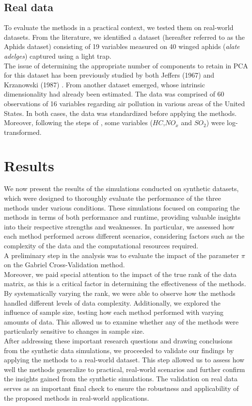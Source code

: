 \documentclass{article}
\begin{document}
\subsection{Real data}
To evaluate the methods in a practical context, we tested them on 
real-world datasets. 
From the literature, we identified a dataset (hereafter referred to as the Aphids dataset) consisting 
of 19 variables measured on 40 winged aphids (\textit{alate adelges}) captured using a 
light trap. \\
The issue of determining the appropriate number of components to retain in PCA for this dataset 
has been previously studied by both Jeffers (1967) \cite{Jeffers} and Krzanowski (1987) \cite{Krzanowski}. 
From \cite{Dray} another dataset emerged, whose intrinsic dimensionality had already been estimated. The
data was comprised of 60 observations of 16 variables regarding air pollution in various areas of the United States.
In both cases, the data was standardized before applying the methods. Moreover, following the steps of \cite{Dray},
some variables ($HC$,$NO_x$ and $SO_2$) were log-transformed.

\section{Results}

We now present the results of the simulations conducted on synthetic datasets, which were designed to thoroughly 
evaluate the performance of the three methods under various conditions. These simulations focused on comparing the 
methods in terms of both performance and runtime, providing valuable insights into their respective strengths and weaknesses. 
In particular, we assessed how each method performed across different scenarios, considering factors such as the complexity of 
the data and the computational resources required.\\
A preliminary step in the analysis was to evaluate the impact of the parameter $\pi$ on the Gabriel Cross-Validation method.\\
Moreover, we paid special attention to the impact of the true rank of the data matrix, as this is a critical factor in determining 
the effectiveness of the methods. By systematically varying the rank, we were able to observe how the methods handled different levels 
of data complexity. Additionally, we explored the influence of sample size, testing how each method performed with varying amounts of data. 
This allowed us to examine whether any of the methods were particularly sensitive to changes in sample size.\\
After addressing these important research questions and drawing conclusions from the synthetic data simulations, 
we proceeded to validate our findings by applying the methods to a real-world dataset. This step allowed us to assess 
how well the methods generalize to practical, real-world scenarios and further confirm the insights gained from the synthetic simulations. 
The validation on real data serves as an important final check to ensure the robustness and applicability of the proposed methods in real-world applications.
\end{document}
